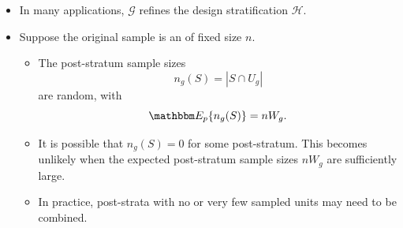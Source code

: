 \documentclass{my_eth_beamer}
\numberwithin{equation}{section}
\begin{document}
\begin{frame}
    \begin{itemize}
    \setlength{\itemsep}{9pt}
        \item In many applications, $\mathscr{G}$ refines the design
            stratification $\mathscr{H}$.
        \item Suppose the original sample is an \alert{\SRS} of fixed size $n$.
            \vspace{0.25em}
            \begin{itemize}
            \setlength{\itemsep}{6pt}
                \item The post-stratum sample sizes
                    \begin{equation*}
                        n_g(S)=|S\cap U_g|
                    \end{equation*}
                    are random, with
                    \begin{equation*}
                        \EE\{n_g(S)\}=nW_g.
                    \end{equation*}
                \item It is possible that $n_g(S)=0$ for some post-stratum.
                    This becomes unlikely when the expected post-stratum sample
                    sizes $nW_g$ are sufficiently large.
                \item In practice, post-strata with no or very few sampled
                    units may need to be \alert{combined}.
            \end{itemize}
    \end{itemize}
\end{frame}
\end{document}
